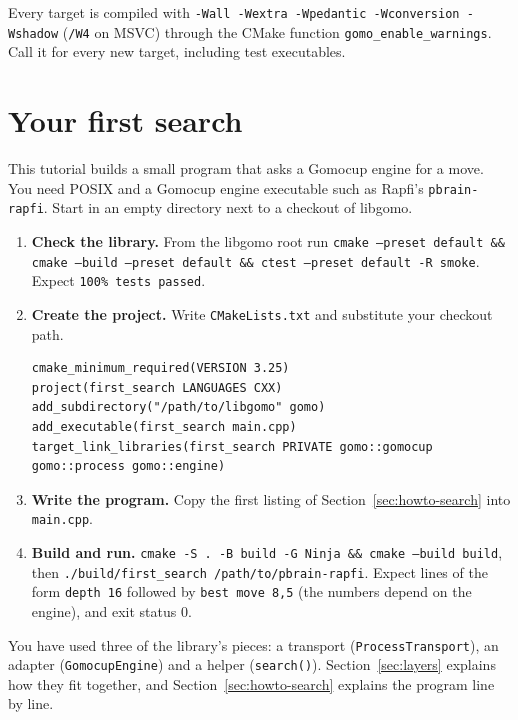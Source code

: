 \documentclass[11pt,a4paper]{article}
\newcommand{\code}[1]{\texttt{#1}}
\newcommand{\file}[1]{\texttt{#1}}
\begin{document}
\noindent Every target is compiled with \code{-Wall -Wextra -Wpedantic -Wconversion -Wshadow}
(\code{/W4} on MSVC) through the CMake function \code{gomo\_enable\_warnings}. Call it for every
new target, including test executables.


\section{Your first search}\label{sec:first}

This tutorial builds a small program that asks a Gomocup engine for a move. You need POSIX and a
Gomocup engine executable such as Rapfi's \file{pbrain-rapfi}. Start in an empty directory next to
a checkout of libgomo.

\begin{enumerate}
  \item \textbf{Check the library.} From the libgomo root run
        \code{cmake --preset default \&\& cmake --build --preset default \&\& ctest --preset default
        -R smoke}. Expect \code{100\% tests passed}.
  \item \textbf{Create the project.} Write \file{CMakeLists.txt} and substitute your checkout path.
\begin{lstlisting}[style=sh]
cmake_minimum_required(VERSION 3.25)
project(first_search LANGUAGES CXX)
add_subdirectory("/path/to/libgomo" gomo)
add_executable(first_search main.cpp)
target_link_libraries(first_search PRIVATE gomo::gomocup gomo::process gomo::engine)
\end{lstlisting}
  \item \textbf{Write the program.} Copy the first listing of Section~\ref{sec:howto-search} into
        \file{main.cpp}.
  \item \textbf{Build and run.} \code{cmake -S . -B build -G Ninja \&\& cmake --build build}, then
        \code{./build/first\_search /path/to/pbrain-rapfi}. Expect lines of the form
        \code{depth 16} followed by \code{best move 8,5} (the numbers depend on the engine),
        and exit status 0.
\end{enumerate}

\noindent You have used three of the library's pieces: a transport (\code{ProcessTransport}), an
adapter (\code{GomocupEngine}) and a helper (\code{search()}). Section~\ref{sec:layers} explains
how they fit together, and Section~\ref{sec:howto-search} explains the program line by line.
\end{document}
